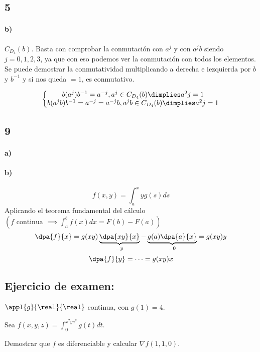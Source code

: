 \documentclass{apuntes}
\begin{document}
\subsection{5}

\paragraph{b)}
$C_{D_4}(b)$. Basta con comprobar la conmutación con $a^j$ y con $a^jb$ siendo $j = 0,1,2,3$, ya que con eso podemos ver la conmutación con todos los elementos. Se puede demostrar la conmutatividad multiplicando a derecha e iezquierda por $b$ y $b^{-1}$ y si nos queda $=1$, es conmutativo.

$$\left\{\begin{matrix}b(a^j)b^{-1} = a^{-j}, a^j \in C_{D_4}(b) \dimplies a^2j = 1\\
b(a^jb)b^{-1} = a^{-j} = a^{-j}b, a^jb \in C_{D_4}(b) \dimplies a^2j = 1\end{matrix}\right.$$

\subsection{9}
\paragraph{a)}
\paragraph{b)}

$$f(x,y) = \int_a^xy g(s)ds$$
Aplicando el teorema fundamental del cálculo $\left(f \text{ continua } \implies\displaystyle\int_a^b f(x)dx = F(b)-F(a)\right)$
$$\dpa{f}{x} = g(xy)\underbrace{\dpa{xy}{x}}_{=y} - \underbrace{g(a)\dpa{a}{x}}_{=0}  = g(xy)y$$
$$\dpa{f}{y} = \cdots  = g(xy)x$$

\subsection{Ejercicio de examen:}
$\appl{g}{\real}{\real}$ continua, con $g(1) = 4$.

Sea $f(x,y,z)=\displaystyle \int_0^{x^2ye^z} g(t)dt$.

Demostrar que $f$ es diferenciable y calcular $\nabla f(1,1,0)$.
\newpage
\end{document}
